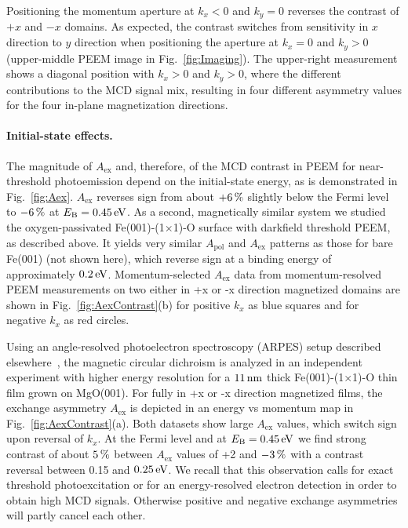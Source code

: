 \documentclass[prl,twocolumn,floatfix,superscriptaddress,aps]{revtex4-2}
\begin{document}
Positioning the momentum aperture at $k_x < 0$ and $k_y = 0$ reverses the contrast of $+x$ and $-x$ domains. As expected, the contrast switches from sensitivity in $x$ direction to $y$ direction when positioning the aperture at $k_x = 0$ and $k_y > 0$ (upper-middle PEEM image in Fig.~\ref{fig:Imaging}). The upper-right measurement shows a diagonal position with $k_x > 0$ and $k_y > 0$, where the different contributions to the MCD signal mix, resulting in four different asymmetry values for the four in-plane magnetization directions. 

\paragraph{Initial-state effects.} The magnitude of $A_{\mathrm{ex}}$ and, therefore, of the MCD contrast in PEEM for near-threshold photoemission depend on the initial-state energy, as is demonstrated in Fig.~\ref{fig:Aex}. $A_{\mathrm{ex}}$ reverses sign from about $\unit[+6]{\%}$ slightly below the Fermi level to $\unit[-6]{\%}$ at $E_{\mathrm{B}} = \unit[0.45]{eV}$. 
As a second, magnetically similar system we studied the oxygen-passivated Fe(001)-(1$\times$1)-O surface with darkfield threshold PEEM, as described above. It yields very similar $A_{\mathrm{pol}}$ and $A_{\mathrm{ex}}$ patterns as those for bare Fe(001) (not shown here), which reverse sign at a binding energy of approximately $\unit[0.2]{eV}$. Momentum-selected $A_{\mathrm{ex}}$ data from momentum-resolved PEEM measurements on two either in +x or -x direction magnetized domains are shown in Fig.~\ref{fig:AexContrast}(b) for positive $k_x$ as blue squares and for negative $k_x$ as red circles. 

Using an angle-resolved photoelectron spectroscopy (ARPES) setup described elsewhere~\cite{gillmeister2018, gillmeister2020}, the magnetic circular dichroism is analyzed in an independent experiment with higher energy resolution for a $\unit[11]{nm}$ thick Fe(001)-(1$\times$1)-O thin film grown on MgO(001). For fully in +x or -x direction magnetized films, the exchange asymmetry $A_{\mathrm{ex}}$ is depicted in an energy vs momentum map in Fig.~\ref{fig:AexContrast}(a). Both datasets show large $A_{\mathrm{ex}}$ values, which switch sign upon reversal of $k_x$. At the Fermi level and at $E_{\mathrm{B}} = \unit[0.45]{eV}$ we find strong contrast of about $\unit[5]{\%}$ between $A_{\mathrm{ex}}$ values of +2 and $\unit[-3]{\%}$ with a contrast reversal between 0.15 and $\unit[0.25]{eV}$. We recall that this observation calls for exact threshold photoexcitation or for an energy-resolved electron detection in order to obtain high MCD signals. Otherwise positive and negative exchange asymmetries will partly cancel each other.
\end{document}
